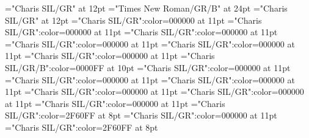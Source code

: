\documentclass[a4paper]{article}
\begin{document}
\pagestyle{plain}
\sloppy
\setlength{\parfillskip}{0pt plus 1fil}
\font{}="Charis SIL/GR" at 12pt
\font{}="Times New Roman/GR/B" at 24pt
\font{}="Charis SIL/GR" at 12pt
\font\entryletDatadicBody="Charis SIL/GR":color=000000 at 11pt
\font\pictureRightentryletDatadicBody="Charis SIL/GR":color=000000 at 11pt
\font\picturepictureRightentryletDatadicBody="Charis SIL/GR":color=000000 at 11pt
\font\pictureCaptionpictureRightentryletDatadicBody="Charis SIL/GR":color=000000 at 11pt
\font\CmPicturepublishStemCaptionSenseNumberpictureCaptionpictureRightentryletDatadicBody="Charis SIL/GR":color=000000 at 11pt
\font\CmPicturepublishStemCaptionCaptionPubptpictureCaptionpictureRightentryletDatadicBody="Charis SIL/GR":color=000000 at 11pt
\font\headwordsehentryletDatadicBody="Charis SIL/GR/B":color=0000FF at 10pt
\font\sensesentryletDatadicBody="Charis SIL/GR":color=000000 at 11pt
\font\sensesensesentryletDatadicBody="Charis SIL/GR":color=000000 at 11pt
\font\grammaticalinfosensesensesentryletDatadicBody="Charis SIL/GR":color=000000 at 11pt
\font\partofspeechptgrammaticalinfosensesensesentryletDatadicBody="Charis SIL/GR":color=000000 at 11pt
\font{}="Charis SIL/GR":color=000000 at 11pt
\font\xitemptdefinitionLcptsensesensesentryletDatadicBody="Charis SIL/GR":color=000000 at 11pt
\font\xlanguagetagenxitemptdefinitionLcptsensesensesentryletDatadicBody="Charis SIL/GR":color=2F60FF at 8pt
\font\xitemendefinitionLcptsensesensesentryletDatadicBody="Charis SIL/GR":color=000000 at 11pt
\font\xlanguagetagenxitemendefinitionLcptsensesensesentryletDatadicBody="Charis SIL/GR":color=2F60FF at 8pt
\end{document}
